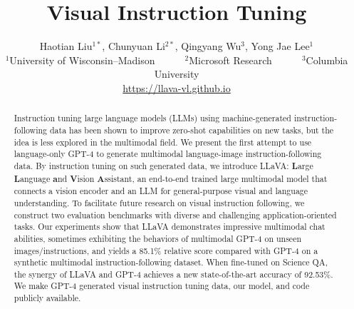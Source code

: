 \documentclass{article}
\title{Visual Instruction Tuning}
\author{
Haotian Liu$^{1*}$, Chunyuan Li$^{2*}$, Qingyang Wu$^{3}$, Yong Jae Lee$^{1}$ \\
$^{1}$University of Wisconsin--Madison~~~~~~$^2$Microsoft Research~~~~~~$^3$Columbia University \\
\href{https://llava-vl.github.io}{https://llava-vl.github.io}
}
\newcommand{\shortname}{LLaVA}
\newcommand{\longname}{{\bf L}arge {\bf L}anguage {\bf a}nd {\bf V}ision {\bf A}ssistant}
\begin{document}
\maketitle

\begin{abstract}
Instruction tuning large language models (LLMs) using machine-generated instruction-following data has been shown to improve zero-shot capabilities on new tasks, but the idea is less explored in the multimodal field.
We present the first attempt to use language-only GPT-4 to generate multimodal language-image instruction-following data. 
By instruction tuning on such generated data, we introduce \shortname{}: \longname{}, an end-to-end trained large multimodal model that connects a vision encoder and an LLM for general-purpose visual and language understanding.
To facilitate future research on visual instruction following, we construct two evaluation benchmarks with diverse and challenging application-oriented tasks.
Our experiments show that \shortname{} demonstrates impressive multimodal chat abilities, sometimes exhibiting the behaviors of multimodal GPT-4 on unseen images/instructions, and yields a 85.1\% relative score compared with GPT-4 on a synthetic multimodal instruction-following dataset.
When fine-tuned on Science QA, the synergy of \shortname{} and GPT-4 achieves a new state-of-the-art accuracy of 92.53\%. We make GPT-4 generated visual instruction tuning data, our model, and code publicly available.

 
\end{abstract}













\clearpage
\appendix


\end{document}
